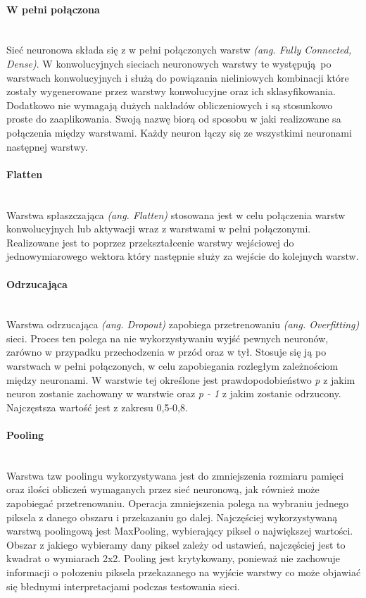 \paragraph{W pełni połączona}  \mbox{}\\
Sieć neuronowa składa się z w pełni połączonych warstw \textit{(ang. Fully Connected, Dense)}.
W konwolucyjnych sieciach neuronowych warstwy te występują po warstwach konwolucyjnych
i służą do powiązania nieliniowych kombinacji które zostały wygenerowane przez
warstwy konwolucyjne oraz ich sklasyfikowania. Dodatkowo nie wymagają dużych nakładów
obliczeniowych i są stosunkowo proste do zaaplikowania. Swoją nazwę biorą od sposobu w jaki
realizowane sa połączenia między warstwami. Każdy neuron łączy się ze wszystkimi neuronami
następnej warstwy.

\paragraph{Flatten}  \mbox{}\\
Warstwa spłaszczająca \textit{(ang. Flatten)} stosowana jest w celu połączenia warstw
konwolucyjnych lub aktywacji wraz z warstwami w pełni połączonymi. Realizowane jest
to poprzez przekształcenie warstwy wejściowej do jednowymiarowego wektora który następnie
służy za wejście do kolejnych warstw.

\paragraph{Odrzucająca}  \mbox{}\\
Warstwa odrzucająca \textit{(ang. Dropout)} zapobiega przetrenowaniu \textit{(ang. Overfitting)}
sieci. Proces ten polega na nie wykorzystywaniu wyjść pewnych neuronów, zarówno
w przypadku przechodzenia w przód oraz w tył. Stosuje się ją po warstwach w pełni
połączonych, w celu zapobiegania rozległym zależnościom między neuronami. W warstwie
tej określone jest prawdopodobieństwo \textit{p} z jakim neuron zostanie zachowany
w warstwie oraz \textit{p - 1} z jakim zostanie odrzucony. Najczęstsza wartość jest
z zakresu 0,5-0,8.

\paragraph{Pooling}  \mbox{}\\
Warstwa tzw poolingu wykorzystywana jest do zmniejszenia rozmiaru pamięci oraz ilości obliczeń
wymaganych przez sieć neuronową, jak również może zapobiegać przetrenowaniu. Operacja zmniejszenia
polega na wybraniu jednego piksela z danego obszaru i przekazaniu go dalej. Najczęściej wykorzystywaną
warstwą poolingową jest MaxPooling, wybierający piksel o największej wartości. Obszar z jakiego
wybieramy dany piksel zależy od ustawień, najczęściej jest to kwadrat o wymiarach 2x2. Pooling
jest krytykowany, ponieważ nie zachowuje informacji o połozeniu piksela przekazanego na wyjście
warstwy co może objawiać się błednymi interpretacjami podczas testowania sieci.

